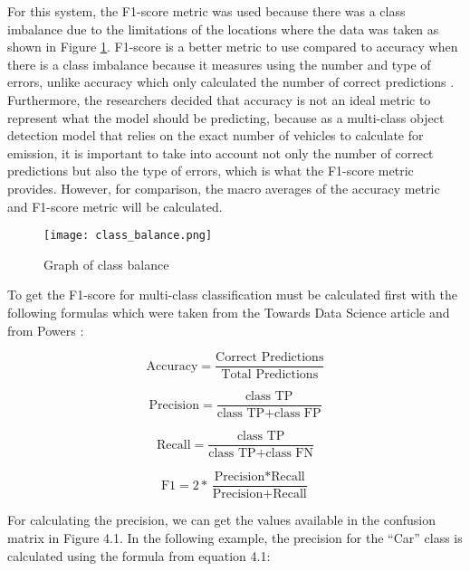 For this system, the F1-score metric was used because there was a class imbalance due to the limitations of the locations where the data was taken as shown in Figure \ref{fig:class_bal}. F1-score is a better metric to use compared to accuracy when there is a class imbalance because it measures using the number and type of errors, unlike accuracy which only calculated the number of correct predictions \cite{Korstanje_2021}. Furthermore, the researchers decided that accuracy is not an ideal metric to represent what the model should be predicting, because as a multi-class object detection model that relies on the exact number of vehicles to calculate for emission, it is important to take into account not only the number of correct predictions but also the type of errors, which is what the F1-score metric provides. However, for comparison, the macro averages of the accuracy metric and F1-score metric will be calculated.  

\begin{figure}[!htbp]
	\texttt{[image: class\_balance.png]}
	\caption{Graph of class balance}
	\label{fig:class_bal}
\end{figure}
\FloatBarrier


To get the F1-score for multi-class classification must be calculated first with the following formulas which were taken from the Towards Data Science article \cite{Korstanje_2021} and from Powers \citeyear{D_Powers}:

\begin{equation}
	{\text{Accuracy}}= \frac{\text{Correct Predictions}}{\text{Total Predictions}} 
\end{equation}


\begin{equation}
{\text{Precision}}= \frac{\text{class TP}}{\text{class TP}+\text{class FP}} 
\end{equation}

\begin{equation}
{\text{Recall}}= \frac{\text{class TP}}{\text{class TP}+\text{class FN}} 
\end{equation}


\begin{equation}
{\text{F1}}= 2 * \frac{\text{Precision}*\text{Recall}}{\text{Precision}+\text{Recall}} 
\end{equation}


For calculating the precision, we can get the values available in the confusion matrix in Figure 4.1. In the following example, the precision for the “Car” class is calculated using the formula from equation 4.1:

